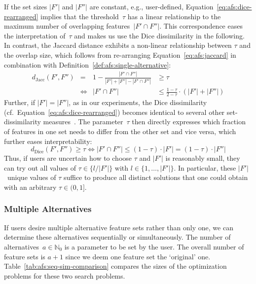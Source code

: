\documentclass{article}
\theoremstyle{definition}
\begin{document}
If the set sizes $|F'|$ and $|F''|$ are constant, e.g., user-defined, Equation~\ref{eq:afs:dice-rearranged} implies that the threshold~$\tau$ has a linear relationship to the maximum number of overlapping features~$|F' \cap F''|$.
This correspondence eases the interpretation of~$\tau$ and makes us use the Dice dissimilarity in the following.
In contrast, the Jaccard distance exhibits a non-linear relationship between $\tau$ and the overlap size, which follows from re-arranging Equation~\ref{eq:afs:jaccard} in combination with Definition~\ref{def:afs:single-alternative}:
%
\begin{equation}
	\begin{aligned}
		d_{\text{Jacc}}(F',F'') &= & 1 - \frac{|F' \cap F''|}{|F'| + |F''| - |F' \cap F''|} &\geq \tau \\
		&\Leftrightarrow & |F' \cap F''| &\leq \frac{1 - \tau}{2 - \tau} \cdot (|F'| + |F''|)
	\end{aligned}
	\label{eq:afs:jaccard-rearranged}
\end{equation}
%
Further, if $|F'| = |F''|$, as in our experiments, the Dice dissimilarity (cf.~Equation~\ref{eq:afs:dice-rearranged}) becomes identical to several other set-dissimilarity measures~\cite{egghe2009new}.
The parameter~$\tau$ then directly expresses which fraction of features in one set needs to differ from the other set and vice versa, which further eases interpretability:
%
\begin{equation}
	d_{\text{Dice}}(F',F'') \geq \tau \Leftrightarrow |F' \cap F''| \leq (1 - \tau) \cdot |F'| = (1 - \tau) \cdot |F''|
	\label{eq:afs:dice-rearranged-equal-size}
\end{equation}
%
Thus, if users are uncertain how to choose $\tau$ and $|F'|$ is reasonably small, they can try out all values of $\tau \in \{l / |F'|\}$ with $l \in \{1, \dots, |F'|\}$.
In particular, these $|F'|$~unique values of $\tau$ suffice to produce all distinct solutions that one could obtain with an arbitrary $\tau \in (0,1]$.

\subsubsection{Multiple Alternatives}
\label{sec:afs:approach:constraints:multiple}

If users desire multiple alternative feature sets rather than only one, we can determine these alternatives sequentially or simultaneously.
The number of alternatives~$a \in \mathbb{N}_0$ is a parameter to be set by the user.
The overall number of feature sets is $a + 1$ since we deem one feature set the `original' one.
Table~\ref{tab:afs:seq-sim-comparison} compares the sizes of the optimization problems for these two search problems.
\end{document}
